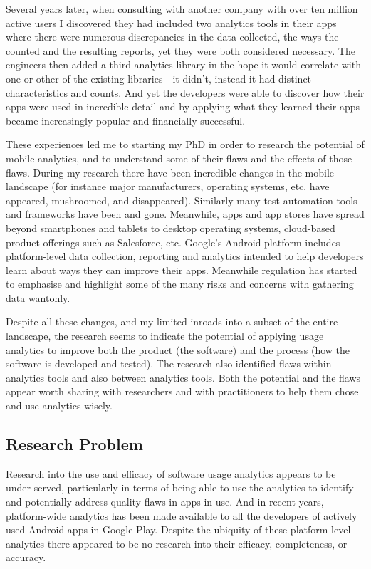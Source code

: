 Several years later, when consulting with another company with over ten million active users I discovered they had included two analytics tools in their apps where there were numerous discrepancies in the data collected, the ways the counted and the resulting reports, yet they were both considered necessary. The engineers then added a third analytics library in the hope it would correlate with one or other of the existing libraries - it didn't, instead it had distinct characteristics and counts. And yet the developers were able to discover how their apps were used in incredible detail and by applying what they learned their apps became increasingly popular and financially successful.

These experiences led me to starting my PhD in order to research the potential of mobile analytics, and to understand some of their flaws and the effects of those flaws. During my research there have been incredible changes in the mobile landscape (for instance major manufacturers, operating systems, etc. have appeared, mushroomed, and disappeared). Similarly many test automation tools and frameworks have been and gone. Meanwhile, apps and app stores have spread beyond smartphones and tablets to desktop operating systems, cloud-based product offerings such as Salesforce, etc. Google's Android platform includes platform-level data collection, reporting and analytics intended to help developers learn about ways they can improve their apps. Meanwhile regulation has started to emphasise and highlight some of the many risks and concerns with gathering data wantonly. 

Despite all these changes, and my limited inroads into a subset of the entire landscape, the research seems to indicate the potential of applying usage analytics to improve both the product (the software) and the process (how the software is developed and tested). The research also identified flaws within analytics tools and also between analytics tools. Both the potential and the flaws appear worth sharing with researchers and with practitioners to help them chose and use analytics wisely.


\subsection{Research Problem}
Research into the use and efficacy of software usage analytics appears to be under-served, particularly in terms of being able to use the analytics to identify and potentially address quality flaws in apps in use. And in recent years, platform-wide analytics has been made available to all the developers of actively used Android apps in Google Play. Despite the ubiquity of these platform-level analytics there appeared to be no research into their efficacy, completeness, or accuracy.




